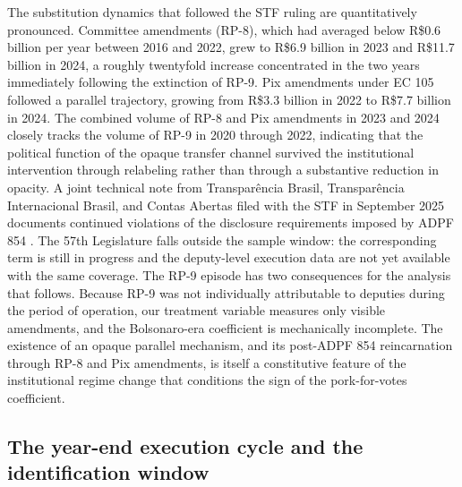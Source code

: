 \documentclass[preprint,12pt,authoryear]{elsarticle}
\begin{document}
The substitution dynamics that followed the STF ruling are quantitatively pronounced. Committee amendments (RP-8), which had averaged below R\$0.6 billion per year between 2016 and 2022, grew to R\$6.9 billion in 2023 and R\$11.7 billion in 2024, a roughly twentyfold increase concentrated in the two years immediately following the extinction of RP-9. Pix amendments under EC 105 followed a parallel trajectory, growing from R\$3.3 billion in 2022 to R\$7.7 billion in 2024. The combined volume of RP-8 and Pix amendments in 2023 and 2024 closely tracks the volume of RP-9 in 2020 through 2022, indicating that the political function of the opaque transfer channel survived the institutional intervention through relabeling rather than through a substantive reduction in opacity. A joint technical note from Transpar\^encia Brasil, Transpar\^encia Internacional Brasil, and Contas Abertas filed with the STF in September 2025 documents continued violations of the disclosure requirements imposed by ADPF 854 \citep{TransparenciaBrasil2025}. The 57th Legislature falls outside the sample window: the corresponding term is still in progress and the deputy-level execution data are not yet available with the same coverage. The RP-9 episode has two consequences for the analysis that follows. Because RP-9 was not individually attributable to deputies during the period of operation, our treatment variable measures only visible amendments, and the Bolsonaro-era coefficient is mechanically incomplete. The existence of an opaque parallel mechanism, and its post-ADPF 854 reincarnation through RP-8 and Pix amendments, is itself a constitutive feature of the institutional regime change that conditions the sign of the pork-for-votes coefficient.

\subsection{The year-end execution cycle and the identification window}
\label{subsec:execution_cycle}
\end{document}
